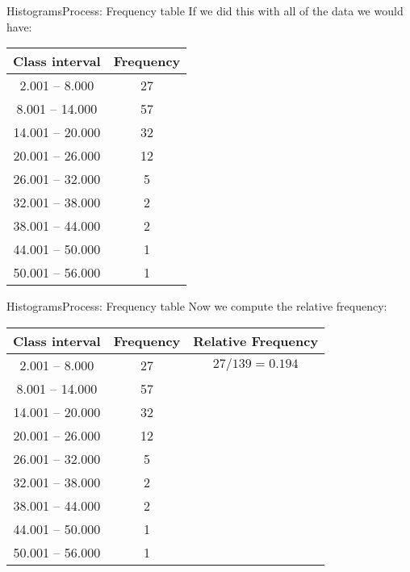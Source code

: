 \documentclass[xcolor=dvipsnames]{beamer}
\begin{document}
\begin{frame}{Histograms}{Process: Frequency table}
If we did this with all of the data we would have:
	\begin{center}
		\begin{tabular}{|c|c|}
			\hline
			\textbf{Class interval} & \textbf{Frequency } \\
			\hline \hline
			2.001 -- 8.000 & 27 \\ \hline 
			8.001 -- 14.000 & 57 \\ \hline 
			14.001 -- 20.000 & 32 \\ \hline 
			20.001 -- 26.000 & 12 \\ \hline 
			26.001 -- 32.000 & 5 \\ \hline 
			32.001 -- 38.000 & 2 \\ \hline 
			38.001 -- 44.000 & 2 \\ \hline 
			44.001 -- 50.000 & 1 \\ \hline 
			50.001 -- 56.000 & 1\\ \hline 
		\end{tabular}
	\end{center}
\end{frame}

\begin{frame}{Histograms}{Process: Frequency table}
	Now we compute the relative frequency:
	\begin{center}
		\begin{tabular}{|c|c|c|}
			\hline
			\textbf{Class interval} & \textbf{Frequency} & \textbf{Relative Frequency} \\
			\hline \hline
			2.001 -- 8.000 & 27 & $27 / 139 = 0.194$ \\ \hline 
			8.001 -- 14.000 & 57 & \\ \hline 
			14.001 -- 20.000 & 32 &\\ \hline 
			20.001 -- 26.000 & 12 &\\ \hline 
			26.001 -- 32.000 & 5 &\\ \hline 
			32.001 -- 38.000 & 2& \\ \hline 
			38.001 -- 44.000 & 2 &\\ \hline 
			44.001 -- 50.000 & 1& \\ \hline 
			50.001 -- 56.000 & 1&\\ \hline 
		\end{tabular}
	\end{center}
\end{frame}
\end{document}
